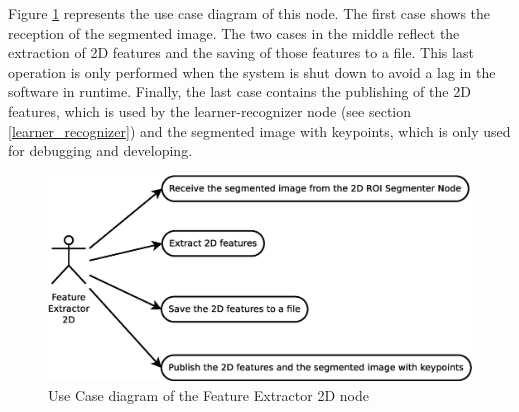 	Figure  \ref{uc_fe2d} represents the use case diagram of this node. 
	The first case shows the reception of the segmented image. 
	The two cases in the middle reflect the extraction of 2D features and the saving of those features to a file. 
	This last operation is only performed when the system is shut down to avoid a lag in the software in runtime. 
	Finally, the last case contains the publishing of the 2D features, which is used by the learner-recognizer node (see section \ref{learner_recognizer}) and the segmented image with keypoints, which is only used for debugging and developing. 
\newpage
	\vspace{0.5cm}
	\begin{figure}[H]
		\centering
			\includegraphics[scale=0.4]{img/diagrams/uc_feature_extractor_2d.eps}
			\caption[Use case diagram Feature Extractor 2D node]{Use Case diagram of the Feature Extractor 2D node}
		\label{uc_fe2d}
	\end{figure}
\vspace{0.5cm}



